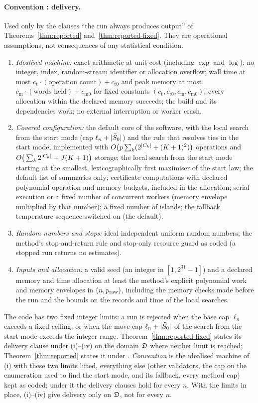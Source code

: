 \paragraph{Convention : delivery.}\label{asm:C2} Used only by the clauses ``the run always produces output'' of
Theorems~\ref{thm:reported} and~\ref{thm:reported-fixed}. They are operational assumptions, not consequences of any
statistical condition.
\begin{enumerate}[label=(\roman*),leftmargin=2em]
  \item \emph{Idealised machine:} exact arithmetic at unit cost (including $\exp$ and $\log$); no integer, index,
    random-stream identifier or allocation overflow; wall time at most $c_{\mathrm t}\cdot(\text{operation count})+c_{\mathrm t0}$ and peak memory at
    most $c_{\mathrm m}\cdot(\text{words held})+c_{\mathrm m0}$ for fixed constants $(c_{\mathrm t},c_{\mathrm t0},c_{\mathrm m},c_{\mathrm m0})$; every allocation within
    the declared memory succeeds; the build and its dependencies work; no external interruption or worker crash.
  \item \emph{Covered configuration:} the default core of the software, with the local search from the start mode (cap
    $\ell_n+\lvert \tilde S_0\rvert$) and the rule that resolves ties in the start mode, implemented with
    $O\big(p\sum_k(2^{\lvert C_k\rvert}+(K+1)^2)\big)$ operations and $O\big(\sum_k2^{\lvert C_k\rvert}+J(K+1)\big)$ storage; the local
    search from the start mode starting at the smallest, lexicographically first maximiser of the start law; the default
    list of summaries only; certificate computations with declared polynomial operation and memory budgets, included in
    the allocation; serial execution or a fixed number of concurrent workers (memory envelope multiplied by that number);
    a fixed number of islands; the fallback temperature sequence switched on (the default).
  \item \emph{Random numbers and stops:} ideal independent uniform random numbers; the method's stop-and-return rule and
    stop-only resource guard as coded (a stopped run returns no estimates).
  \item \emph{Inputs and allocation:} a valid seed (an integer in $[1,2^{31}-1]$) and a declared memory and time allocation
    at least the method's explicit polynomial work and memory envelopes in $(n,p_{\mathrm{raw}})$, including the memory checks made before the run and
    the bounds on the records and time of the local searches.
\end{enumerate}
The code has two fixed integer limits: a run is rejected when the base cap $\ell_n$ exceeds a fixed ceiling, or when the
move cap $\ell_n+\lvert \tilde S_0\rvert$ of the search from the start mode exceeds the integer range. Theorem~\ref{thm:reported-fixed} states its delivery clause under (i)--(iv) on the domain $\mathfrak D$ where neither limit
is reached; Theorem~\ref{thm:reported} states it under . \emph{Convention } is the idealised machine of (i)
with these two limits lifted, everything else (other validators, the cap on the enumeration used to find the start mode, and its fallback, every
method cap) kept as coded; under it the delivery clauses hold for every $n$. With the limits in place, (i)--(iv) give delivery only on $\mathfrak D$, not for every
$n$.

